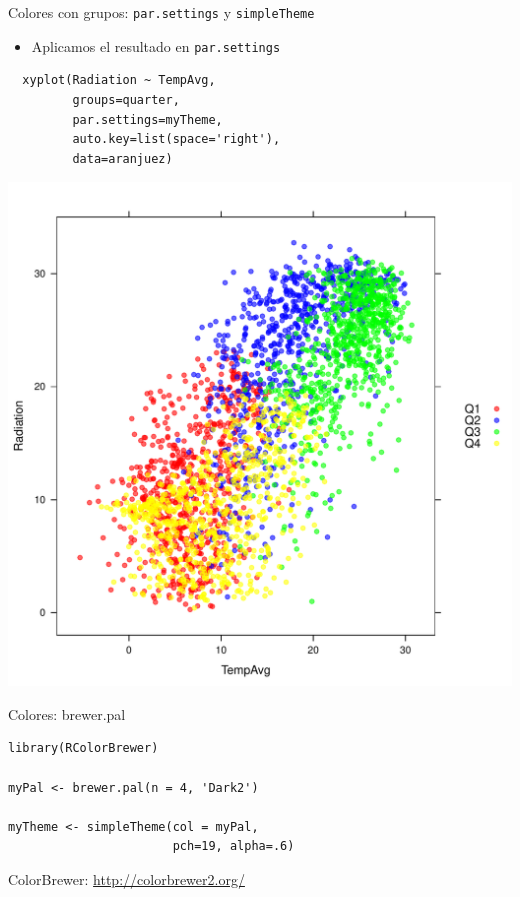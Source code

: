 \documentclass[xcolor={usenames,svgnames,dvipsnames}]{beamer}
\begin{document}
\begin{frame}[fragile,label=sec-6-2-8]{Colores con grupos: \texttt{par.settings} y \texttt{simpleTheme}}
 \begin{itemize}
\item Aplicamos el resultado en \texttt{par.settings}
\end{itemize}
\lstset{language=R,label= ,caption= ,numbers=none}
\begin{lstlisting}
  xyplot(Radiation ~ TempAvg,
         groups=quarter,
         par.settings=myTheme,
         auto.key=list(space='right'),
         data=aranjuez)
\end{lstlisting}
\end{frame}

\begin{frame}[label=sec-6-2-9]{}
\includegraphics[width=.9\linewidth]{figs/myTheme.pdf}
\end{frame}

\begin{frame}[fragile,label=sec-6-2-10]{Colores: brewer.pal}
 \lstset{language=R,label= ,caption= ,numbers=none}
\begin{lstlisting}
library(RColorBrewer)

myPal <- brewer.pal(n = 4, 'Dark2')

myTheme <- simpleTheme(col = myPal,
                       pch=19, alpha=.6)
\end{lstlisting}

\begin{block}{ColorBrewer: \url{http://colorbrewer2.org/}}
\end{block}
\end{frame}
\end{document}
